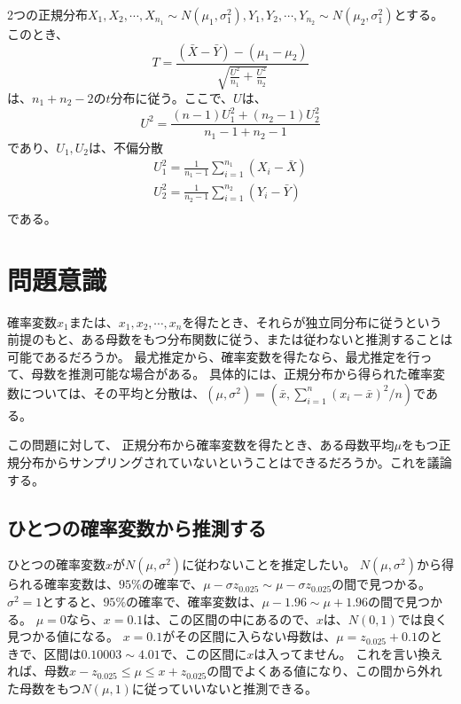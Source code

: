 \documentclass[a4paper,11pt,dvipdfmx]{jsarticle}
\begin{document}
2つの正規分布$X_1,X_2,\cdots,X_{n_1} \sim N(\mu_1,\sigma_1^2), Y_1,Y_2,\cdots,Y_{n_2}\sim N(\mu_2,\sigma_1^2)$とする。このとき、
\begin{equation*}
    T = \frac{(\bar{X}-\bar{Y})-(\mu_1-\mu_2)}{\sqrt{\frac{U^2}{n_1}+\frac{U^2}{n_2}}}
\end{equation*}
は、$n_1+n_2-2$の$t$分布に従う。ここで、$U$は、
\begin{equation*}
    U^2 = \frac{(n-1)U_1^2+(n_2-1)U_2^2}{n_1-1+n_2-1}
\end{equation*}
であり、$U_1,U_2$は、不偏分散
\begin{eqnarray*}
    U_1^2 = \frac{1}{n_1-1}\sum_{i=1}^{n_1}(X_i-\bar{X})\\
    U_2^2 = \frac{1}{n_2-1}\sum_{i=1}^{n_2}(Y_i-\bar{Y})\\
\end{eqnarray*}
である。

\section{問題意識}
確率変数$x_1$または、$x_1,x_2,\cdots,x_n$を得たとき、それらが独立同分布に従うという前提のもと、ある母数をもつ分布関数に従う、または従わないと推測することは可能であるだろうか。
最尤推定から、確率変数を得たなら、最尤推定を行って、母数を推測可能な場合がある。
具体的には、正規分布から得られた確率変数については、その平均と分散は、$(\mu,\sigma^2)=(\bar{x},\sum_{i=1}^{n} (x_i-\bar{x})^2/n)$である。

この問題に対して、
正規分布から確率変数を得たとき、ある母数平均$\mu$をもつ正規分布からサンプリングされていないということはできるだろうか。これを議論する。



\subsection{ひとつの確率変数から推測する}
ひとつの確率変数$x$が$N(\mu,\sigma^2)$に従わないことを推定したい。
$N(\mu,\sigma^2)$から得られる確率変数は、$95\%$の確率で、$\mu-\sigma z_{0.025}\sim \mu-\sigma z_{0.025}$の間で見つかる。
$\sigma^2=1$とすると、$95\%$の確率で、確率変数は、$\mu-1.96\sim\mu+1.96$の間で見つかる。
$\mu=0$なら、$x=0.1$は、この区間の中にあるので、$x$は、$N(0,1)$では良く見つかる値になる。
$x=0.1$がその区間に入らない母数は、$\mu=z_{0.025}+0.1$のときで、区間は$0.10003\sim4.01$で、この区間に$x$は入ってません。
これを言い換えれば、母数$x-z_{0.025}\leq\mu\leq x+z_{0.025}$の間でよくある値になり、この間から外れた母数をもつ$N(\mu,1)$に従っていいないと推測できる。
\end{document}
